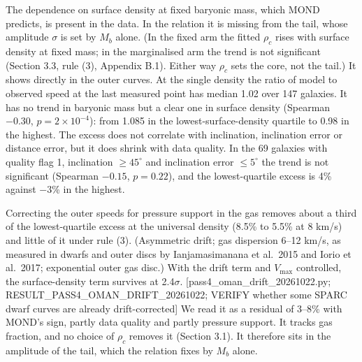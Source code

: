 \documentclass[
  10pt,
]{article}
\begin{document}
The dependence on surface density at fixed baryonic mass, which MOND predicts, is present in the data. In the relation it is missing from the tail, whose amplitude $\sigma$ is set by $M_b$ alone. (In the fixed arm the fitted $\rho_c$ rises with surface density at fixed mass; in the marginalised arm the trend is not significant (Section 3.3, rule (3), Appendix B.1). Either way $\rho_c$ sets the core, not the tail.) It shows directly in the outer curves. At the single density the ratio of model to observed speed at the last measured point has median 1.02 over 147 galaxies. It has no trend in baryonic mass but a clear one in surface density (Spearman $-0.30$, $p=2\times10^{-4}$): from 1.085 in the lowest-surface-density quartile to 0.98 in the highest. The excess does not correlate with inclination, inclination error or distance error, but it does shrink with data quality. In the 69 galaxies with quality flag 1, inclination $\ge45^\circ$ and inclination error $\le5^\circ$ the trend is not significant (Spearman $-0.15$, $p=0.22$), and the lowest-quartile excess is 4\% against $-3$\% in the highest.

Correcting the outer speeds for pressure support in the gas removes about a third of the lowest-quartile excess at the universal density (8.5\% to 5.5\% at 8 km/s) and little of it under rule (3). (Asymmetric drift; gas dispersion 6--12 km/s, as measured in dwarfs and outer discs by Ianjamasimanana et al.~2015 and Iorio et al.~2017; exponential outer gas disc.) With the drift term and $V_{\max}$ controlled, the surface-density term survives at 2.4$\sigma$. {[}pass4\_oman\_drift\_20261022.py; RESULT\_PASS4\_OMAN\_DRIFT\_20261022; VERIFY whether some SPARC dwarf curves are already drift-corrected{]} We read it as a residual of 3--8\% with MOND's sign, partly data quality and partly pressure support. It tracks gas fraction, and no choice of $\rho_c$ removes it (Section 3.1). It therefore sits in the amplitude of the tail, which the relation fixes by $M_b$ alone.
\end{document}
